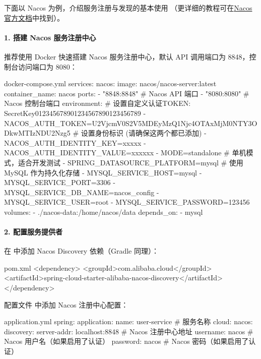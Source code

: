 下面以 Nacos 为例，介绍服务注册与发现的基本使用 （更详细的教程可在\href{https://nacos.io}{Nacos 官方文档}中找到）。
\paragraph{1. 搭建 Nacos 服务注册中心}
推荐使用 Docker 快速搭建 Nacos 服务注册中心，默认 API 调用端口为 8848，控制台访问端口为 8080：
\begin{codeblock}[yml]{docker-compose.yml}
services:
    nacos:
    image: nacos/nacos-server:latest
    container_name: nacos
    ports:
        - "8848:8848" # Nacos API 端口
        - "8080:8080" # Nacos 控制台端口
    environment:
        # 设置自定义认证TOKEN: SecretKey012345678901234567890123456789
        - NACOS_AUTH_TOKEN=U2VjcmV0S2V5MDEyMzQ1Njc4OTAxMjM0NTY3ODkwMTIzNDU2Nzg5
        # 设置身份标识 (请确保这两个都已添加)
        - NACOS_AUTH_IDENTITY_KEY=xxxxx
        - NACOS_AUTH_IDENTITY_VALUE=xxxxxx
        - MODE=standalone # 单机模式，适合开发测试
        - SPRING_DATASOURCE_PLATFORM=mysql # 使用 MySQL 作为持久化存储
        - MYSQL_SERVICE_HOST=mysql
        - MYSQL_SERVICE_PORT=3306
        - MYSQL_SERVICE_DB_NAME=nacos_config
        - MYSQL_SERVICE_USER=root
        - MYSQL_SERVICE_PASSWORD=123456
    volumes:
        - ./nacos-data:/home/nacos/data
    depends_on:
        - mysql
\end{codeblock}


\paragraph{2. 配置服务提供者}
在  中添加 Nacos Discovery 依赖（Gradle 同理）：

\begin{codeblock}[xml]{pom.xml}
<dependency>
    <groupId>com.alibaba.cloud</groupId>
    <artifactId>spring-cloud-starter-alibaba-nacos-discovery</artifactId>
</dependency>
\end{codeblock}


配置文件  中添加 Nacos 注册中心配置：
\begin{codeblock}[yml]{application.yml}
spring:
    application:
    name: user-service # 服务名称
    cloud:
        nacos:
            discovery:
                server-addr: localhost:8848 # Nacos 注册中心地址
                username: nacos # Nacos 用户名（如果启用了认证）
                password: nacos # Nacos 密码（如果启用了认证）
\end{codeblock}

